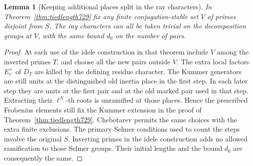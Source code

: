\documentclass[a4paper,11pt]{article}
\newtheorem{lemma}[proposition]{Lemma}
\theoremstyle{definition}
\theoremstyle{remark}
\numberwithin{equation}{section}
\begin{document}
\begin{lemma}[Keeping additional places split in the ray characters]
\leavevmode\label{lem:fixedsplit731}
In Theorem~\ref{thm:tiedlength729} fix any finite conjugation-stable
set \(V\) of primes disjoint from \(S\). The ray characters can all
be taken trivial on the decomposition groups at \(V\), with the
same bound \(d_0\) on the number of pairs.
\end{lemma}
\begin{proof}
At each use of the idele construction in that theorem include \(V\)
among the inverted primes \(T\), and choose all the new pairs
outside \(V\). The extra local factors \(E_v^\times\) of \(D_T\)
are killed by the defining residue character. The Kummer generators
are still units at the distinguished old inertia place in the first
step. In each later step they are units at the first pair and at
the old marked pair used in that step. Extracting their
\(\ell^N\)-th roots is unramified at those places. Hence the
prescribed Frobenius elements still fix the Kummer extension in
the proof of Theorem~\ref{thm:tiedlength729}. Chebotarev permits the
same choices with the extra finite exclusions. The primary Selmer
conditions used to count the steps involve the original \(S\).
Inverting primes in the idele construction adds no allowed
ramification to those Selmer groups. Their initial lengths and the
bound \(d_0\) are consequently the same.
\end{proof}
\end{document}

